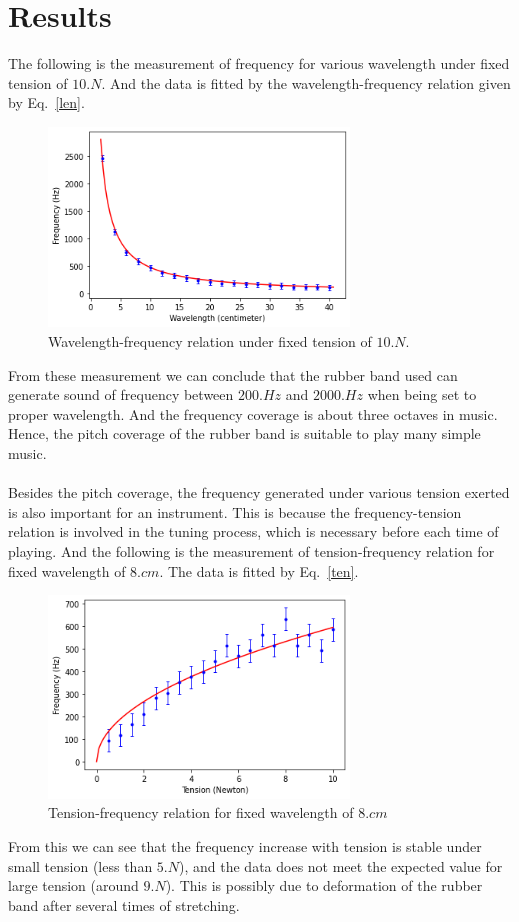 \documentclass[twocolumn,preprintnumbers,amsmath,amssymb,longbibliography]{revtex4-1}
\begin{document}
\section{Results}
The following is the measurement of frequency for various wavelength under fixed tension of $10\si{.N}$. And the data is fitted by the wavelength-frequency relation given by Eq.~\eqref{len}.
\begin{figure}[H]
\centering
\includegraphics[width=8cm]{l-f.png}
\caption{\label{sp} Wavelength-frequency relation under fixed tension of $10 \si{.N}$.} 
\end{figure}
From these measurement we can conclude that the rubber band used can generate sound of frequency between $200\si{.Hz}$ and $2000\si{.Hz}$ when being set to proper wavelength. And the frequency coverage is about three octaves in music.\cite{freqTable} Hence, the pitch coverage of the rubber band is suitable to play many simple music.
\\
\\
Besides the pitch coverage, the frequency generated under various tension exerted is also important for an instrument. This is because the frequency-tension relation is involved in the tuning process, which is necessary before each time of playing. And the following is the measurement  of tension-frequency relation for fixed wavelength of $8\si{.cm}$. The data is fitted by Eq.~\eqref{ten}.
\begin{figure}[H]
\centering
\includegraphics[width=8cm]{t-f.png}
\caption{\label{sp} Tension-frequency relation for fixed wavelength of $8\si{.cm}$} 
\end{figure}
From this we can see that the frequency increase with tension is stable under small tension (less than $5\si{.N}$), and the data does not meet the expected value for large tension (around $9\si{.N}$). This is possibly due to deformation of the rubber band after several times of stretching. 
\end{document}
